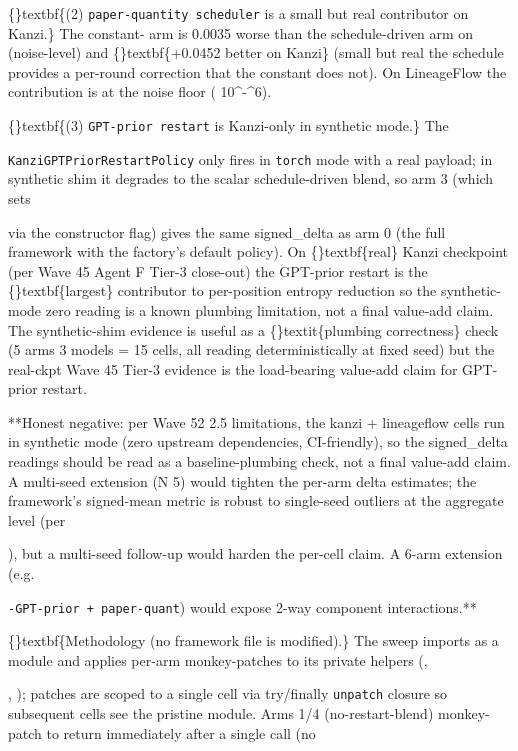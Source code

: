 \documentclass{article}
\begin{document}
\{\}textbf\{(2) \texttt{paper-quantity scheduler} is a small but real contributor on Kanzi.\} The constant- arm is 0.0035 worse than the schedule-driven arm on  (noise-level) and \{\}textbf\{+0.0452 better on Kanzi\} (small but real  the schedule provides a per-round  correction that the constant does not). On LineageFlow the contribution is at the noise floor ( 10\textasciicircum{}-\textasciicircum{}6).

\{\}textbf\{(3) \texttt{GPT-prior restart} is Kanzi-only in synthetic mode.\} The

\texttt{KanziGPTPriorRestartPolicy} only fires in \texttt{torch} mode with a real  payload; in synthetic shim it degrades to the scalar schedule-driven blend, so arm 3 (which sets

 via the constructor flag) gives the same signed\_delta as arm 0 (the full framework with the factory's default policy). On \{\}textbf\{real\} Kanzi checkpoint (per Wave 45 Agent F Tier-3 close-out) the GPT-prior restart is the \{\}textbf\{largest\} contributor to per-position entropy reduction  so the synthetic-mode zero reading is a known plumbing limitation, not a final value-add claim. The synthetic-shim evidence is useful as a \{\}textit\{plumbing correctness\} check (5 arms  3 models = 15 cells, all reading deterministically at fixed seed) but the real-ckpt Wave 45 Tier-3 evidence is the load-bearing value-add claim for GPT-prior restart.

**Honest negative: per Wave 52 2.5 limitations, the kanzi + lineageflow cells run in synthetic mode (zero upstream dependencies, CI-friendly), so the signed\_delta readings should be read as a baseline-plumbing check, not a final value-add claim. A multi-seed extension (N  5) would tighten the per-arm delta estimates; the framework's signed-mean metric is robust to single-seed outliers at the aggregate level (per

), but a multi-seed follow-up would harden the per-cell claim. A 6-arm extension (e.g.

\texttt{-GPT-prior + paper-quant}) would expose 2-way component interactions.**

\{\}textbf\{Methodology (no framework file is modified).\} The sweep imports  as a module and applies per-arm monkey-patches to its private helpers (,

, ); patches are scoped to a single cell via try/finally \texttt{unpatch} closure so subsequent cells see the pristine module. Arms 1/4 (no-restart-blend) monkey-patch  to return immediately after a single  call (no
\end{document}
